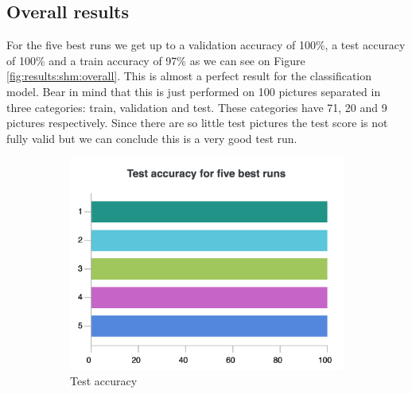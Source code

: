\subsection{Overall results}


	For the five best runs we get up to a validation accuracy of 100\%, a test accuracy of 100\% and a train accuracy of 97\% as we can see on Figure \ref{fig:results:shm:overall}. This is almost a perfect result for the classification model. Bear in mind that this is just performed on 100 pictures separated in three categories: train, validation and test. These categories have 71, 20 and 9 pictures respectively. Since there are so little test pictures the test score is not fully valid but we can conclude this is a very good test run.

	\begin{figure}[hbtp]
		\begin{subfigure}{0.31\textwidth}
			\centering
			\includegraphics[width=\linewidth]{fig/results/wandb/second_handmade_sweep/charts/Section-2-Panel-0-jm7rxjojx.png}
			\caption{Test accuracy}
		\end{subfigure}
		\hspace*{\fill}   %
		\begin{subfigure}{0.31\textwidth}
			\centering

\end{subfigure}
\end{figure}
